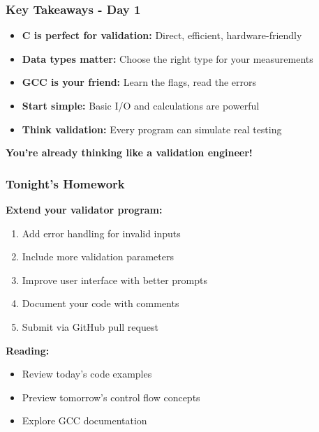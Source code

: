 \documentclass{beamer}
\begin{document}
\begin{frame}
\frametitle{Key Takeaways - Day 1}
\begin{itemize}
    \item \textbf{C is perfect for validation:} Direct, efficient, hardware-friendly
    \item \textbf{Data types matter:} Choose the right type for your measurements
    \item \textbf{GCC is your friend:} Learn the flags, read the errors
    \item \textbf{Start simple:} Basic I/O and calculations are powerful
    \item \textbf{Think validation:} Every program can simulate real testing
\end{itemize}

\vspace{0.5cm}
\begin{center}
\textbf{You're already thinking like a validation engineer!}
\end{center}
\end{frame}

\begin{frame}
\frametitle{Tonight's Homework}
\textbf{Extend your validator program:}
\begin{enumerate}
    \item Add error handling for invalid inputs
    \item Include more validation parameters
    \item Improve user interface with better prompts
    \item Document your code with comments
    \item Submit via GitHub pull request
\end{enumerate}

\vspace{0.5cm}
\textbf{Reading:}
\begin{itemize}
    \item Review today's code examples
    \item Preview tomorrow's control flow concepts
    \item Explore GCC documentation
\end{itemize}
\end{frame}
\end{document}
